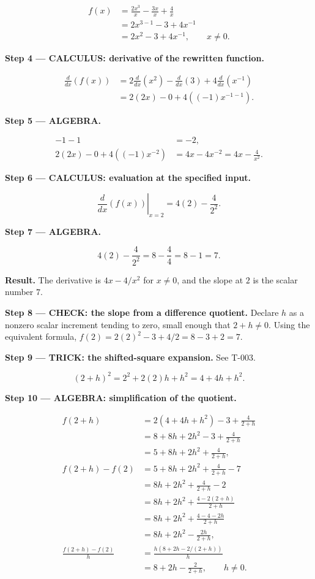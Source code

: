 \documentclass[11pt,oneside,openany]{book}
\begin{document}
\[
\begin{aligned}
f(x)&=\frac{2x^3}{x}-\frac{3x}{x}+\frac4x\\
&=2x^{3-1}-3+4x^{-1}\\
&=2x^2-3+4x^{-1},\qquad x\ne0.
\end{aligned}
\]

\endgroup
\textbf{Step 4 --- CALCULUS: derivative of the rewritten function.}

\[
\begin{aligned}
\frac{d}{dx}\left(f(x)\right)
&=2\frac{d}{dx}\left(x^2\right)
-\frac{d}{dx}\left(3\right)
+4\frac{d}{dx}\left(x^{-1}\right)\\
&=2(2x)-0+4((-1)x^{-1-1}).
\end{aligned}
\]

\begingroup\color{AlgebraBlue}
\textbf{Step 5 --- ALGEBRA.}

\[
\begin{aligned}
-1-1&=-2,\\
2(2x)-0+4((-1)x^{-2})
&=4x-4x^{-2}=4x-\frac4{x^2}.
\end{aligned}
\]

\endgroup
\textbf{Step 6 --- CALCULUS: evaluation at the specified input.}

\[
\left.\frac{d}{dx}\left(f(x)\right)\right|_{x=2}
=4(2)-\frac4{2^2}.
\]

\begingroup\color{AlgebraBlue}
\textbf{Step 7 --- ALGEBRA.}

\[
4(2)-\frac4{2^2}=8-\frac4{4}=8-1=7.
\]

\endgroup
\textbf{Result.} The derivative is \(4x-4/x^2\) for \(x\ne0\), and the slope at \(2\)
is the scalar number \(7\).

\textbf{Step 8 --- CHECK: the slope from a difference quotient.} Declare \(h\)
as a nonzero scalar increment tending to zero, small enough that \(2+h\ne0\).
Using the equivalent formula, \(f(2)=2(2)^2-3+4/2=8-3+2=7\).

\begingroup\color{TrickPurple}
\textbf{Step 9 --- TRICK: the shifted-square expansion.} See
T-003.

\[
(2+h)^2=2^2+2(2)h+h^2=4+4h+h^2.
\]

\endgroup
\begingroup\color{AlgebraBlue}
\textbf{Step 10 --- ALGEBRA: simplification of the quotient.}

\[
\begin{aligned}
f(2+h)&=2(4+4h+h^2)-3+\frac4{2+h}\\
&=8+8h+2h^2-3+\frac4{2+h}\\
&=5+8h+2h^2+\frac4{2+h},\\
f(2+h)-f(2)&=5+8h+2h^2+\frac4{2+h}-7\\
&=8h+2h^2+\frac4{2+h}-2\\
&=8h+2h^2+\frac{4-2(2+h)}{2+h}\\
&=8h+2h^2+\frac{4-4-2h}{2+h}\\
&=8h+2h^2-\frac{2h}{2+h},\\
\frac{f(2+h)-f(2)}h
&=\frac{h(8+2h-2/(2+h))}{h}\\
&=8+2h-\frac2{2+h},\qquad h\ne0.
\end{aligned}
\]
\end{document}
